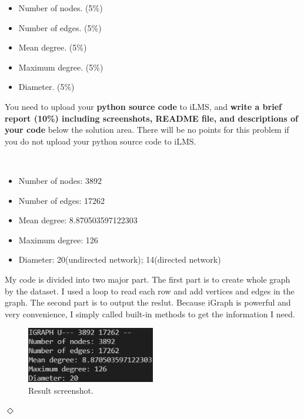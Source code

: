 \documentclass[12pt]{article}
\newcommand {\bsolution}{\noindent {\em Solution:} \ }
\newcommand{\esolution}{\hfill $\Diamond$ \\ \vspace{.3cm}}
\begin{document}
\begin{itemize}
	\item Number of nodes. (5\%)
	\item Number of edges. (5\%)
	\item Mean degree. (5\%)
	\item Maximum degree. (5\%)
	\item Diameter. (5\%)
\end{itemize}
You need to upload your {\bf python source code} to iLMS, and {\bf write a brief report (10\%) including screenshots, README file, and descriptions of your code} below the solution area. There will be no points for this problem if you do not upload your python source code to iLMS.

\bsolution
\begin{itemize}
	\item Number of nodes: 3892
	\item Number of edges: 17262
	\item Mean degree: 8.870503597122303
	\item Maximum degree: 126
	\item Diameter: 20(undirected network); 14(directed network)
\end{itemize}
My code is divided into two major part. The first part is to create whole graph by the dataset. I used a loop to read each row and add vertices and edges in the graph. The second part is to output the reslut. Because iGraph is powerful and very convenience, I simply called built-in methods to get the information I need. 
\begin{figure}[h]
	\centering
	\includegraphics[width=0.5\textwidth]{fig-prob6.png}
	\caption{Result screenshot.}
	\label{HW1_6}
\end{figure}
\esolution

\end{document}
